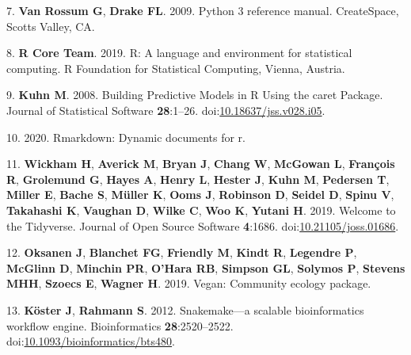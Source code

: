 \documentclass[11pt,]{article}
\begin{document}
\leavevmode\hypertarget{ref-python}{}%
7. \textbf{Van Rossum G}, \textbf{Drake FL}. 2009. Python 3 reference
manual. CreateSpace, Scotts Valley, CA.

\leavevmode\hypertarget{ref-R}{}%
8. \textbf{R Core Team}. 2019. R: A language and environment for
statistical computing. R Foundation for Statistical Computing, Vienna,
Austria.

\leavevmode\hypertarget{ref-kuhn_building_2008}{}%
9. \textbf{Kuhn M}. 2008. Building Predictive Models in R Using the
caret Package. Journal of Statistical Software \textbf{28}:1--26.
doi:\href{https://doi.org/10.18637/jss.v028.i05}{10.18637/jss.v028.i05}.

\leavevmode\hypertarget{ref-rmarkdown}{}%
10. 2020. Rmarkdown: Dynamic documents for r.

\leavevmode\hypertarget{ref-wickham_welcome_2019}{}%
11. \textbf{Wickham H}, \textbf{Averick M}, \textbf{Bryan J},
\textbf{Chang W}, \textbf{McGowan L}, \textbf{François R},
\textbf{Grolemund G}, \textbf{Hayes A}, \textbf{Henry L}, \textbf{Hester
J}, \textbf{Kuhn M}, \textbf{Pedersen T}, \textbf{Miller E},
\textbf{Bache S}, \textbf{Müller K}, \textbf{Ooms J}, \textbf{Robinson
D}, \textbf{Seidel D}, \textbf{Spinu V}, \textbf{Takahashi K},
\textbf{Vaughan D}, \textbf{Wilke C}, \textbf{Woo K}, \textbf{Yutani H}.
2019. Welcome to the Tidyverse. Journal of Open Source Software
\textbf{4}:1686.
doi:\href{https://doi.org/10.21105/joss.01686}{10.21105/joss.01686}.

\leavevmode\hypertarget{ref-vegan}{}%
12. \textbf{Oksanen J}, \textbf{Blanchet FG}, \textbf{Friendly M},
\textbf{Kindt R}, \textbf{Legendre P}, \textbf{McGlinn D},
\textbf{Minchin PR}, \textbf{O'Hara RB}, \textbf{Simpson GL},
\textbf{Solymos P}, \textbf{Stevens MHH}, \textbf{Szoecs E},
\textbf{Wagner H}. 2019. Vegan: Community ecology package.

\leavevmode\hypertarget{ref-snakemake}{}%
13. \textbf{Köster J}, \textbf{Rahmann S}. 2012. Snakemake---a scalable
bioinformatics workflow engine. Bioinformatics \textbf{28}:2520--2522.
doi:\href{https://doi.org/10.1093/bioinformatics/bts480}{10.1093/bioinformatics/bts480}.
\end{document}
